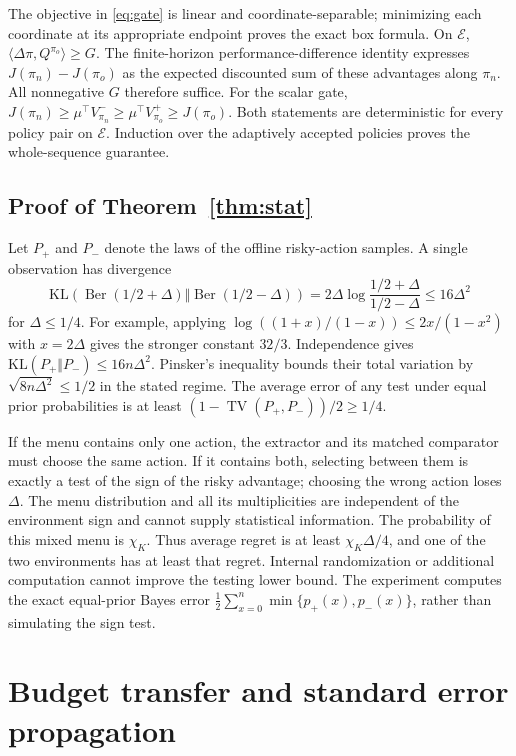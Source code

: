\documentclass[11pt]{article}
\newcommand{\TV}{\operatorname{TV}}\newcommand{\spn}{\operatorname{span}}
\begin{document}
The objective in \eqref{eq:gate} is linear and coordinate-separable; minimizing each coordinate at its appropriate endpoint proves the exact box formula. On $\mathcal E$, $\langle\Delta\pi,Q^{\pi_o}\rangle\ge G$. The finite-horizon performance-difference identity expresses $J(\pi_n)-J(\pi_o)$ as the expected discounted sum of these advantages along $\pi_n$. All nonnegative $G$ therefore suffice. For the scalar gate, $J(\pi_n)\ge\mu^\top V^-_{\pi_n}\ge\mu^\top V^+_{\pi_o}\ge J(\pi_o)$. Both statements are deterministic for every policy pair on $\mathcal E$. Induction over the adaptively accepted policies proves the whole-sequence guarantee.

\subsection{Proof of Theorem~\ref{thm:stat}}
Let $P_+$ and $P_-$ denote the laws of the offline risky-action samples. A single observation has divergence
\[
 \mathrm{KL}(\operatorname{Ber}(1/2+\Delta)\Vert\operatorname{Ber}(1/2-\Delta))
 =2\Delta\log\frac{1/2+\Delta}{1/2-\Delta}\le16\Delta^2
\]
for $\Delta\le1/4$. For example, applying $\log((1+x)/(1-x))\le2x/(1-x^2)$ with $x=2\Delta$ gives the stronger constant $32/3$. Independence gives $\mathrm{KL}(P_+\Vert P_-)\le16n\Delta^2$. Pinsker's inequality bounds their total variation by $\sqrt{8n\Delta^2}\le1/2$ in the stated regime. The average error of any test under equal prior probabilities is at least $(1-\TV(P_+,P_-))/2\ge1/4$.

If the menu contains only one action, the extractor and its matched comparator must choose the same action. If it contains both, selecting between them is exactly a test of the sign of the risky advantage; choosing the wrong action loses $\Delta$. The menu distribution and all its multiplicities are independent of the environment sign and cannot supply statistical information. The probability of this mixed menu is $\chi_K$. Thus average regret is at least $\chi_K\Delta/4$, and one of the two environments has at least that regret. Internal randomization or additional computation cannot improve the testing lower bound. The experiment computes the exact equal-prior Bayes error $\tfrac12\sum_{x=0}^n\min\{p_+(x),p_-(x)\}$, rather than simulating the sign test.

\section{Budget transfer and standard error propagation}
\end{document}
